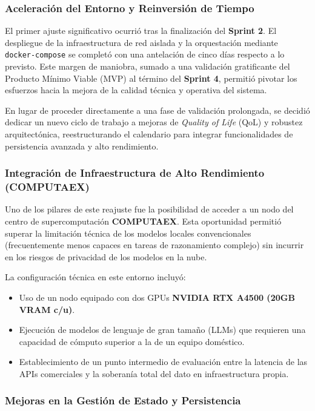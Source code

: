 \subsubsection{Aceleración del Entorno y Reinversión de Tiempo}

El primer ajuste significativo ocurrió tras la finalización del \textbf{Sprint 2}. El despliegue de la infraestructura de red aislada y la orquestación mediante \texttt{docker-compose} se completó con una antelación de cinco días respecto a lo previsto. Este margen de maniobra, sumado a una validación gratificante del Producto Mínimo Viable (MVP) al término del \textbf{Sprint 4}, permitió pivotar los esfuerzos hacia la mejora de la calidad técnica y operativa del sistema.

En lugar de proceder directamente a una fase de validación prolongada, se decidió dedicar un nuevo ciclo de trabajo a mejoras de \textit{Quality of Life} (QoL) y robustez arquitectónica, reestructurando el calendario para integrar funcionalidades de persistencia avanzada y alto rendimiento.

\subsubsection{Integración de Infraestructura de Alto Rendimiento (COMPUTAEX)}

Uno de los pilares de este reajuste fue la posibilidad de acceder a un nodo del centro de supercomputación \textbf{COMPUTAEX}. Esta oportunidad permitió superar la limitación técnica de los modelos locales convencionales (frecuentemente menos capaces en tareas de razonamiento complejo) sin incurrir en los riesgos de privacidad de los modelos en la nube.

La configuración técnica en este entorno incluyó:
\begin{itemize}
    \item Uso de un nodo equipado con dos GPUs \textbf{NVIDIA RTX A4500 (20GB VRAM c/u)}.
    \item Ejecución de modelos de lenguaje de gran tamaño (LLMs) que requieren una capacidad de cómputo superior a la de un equipo doméstico.
    \item Establecimiento de un punto intermedio de evaluación entre la latencia de las APIs comerciales y la soberanía total del dato en infraestructura propia.
\end{itemize}

\subsubsection{Mejoras en la Gestión de Estado y Persistencia}

